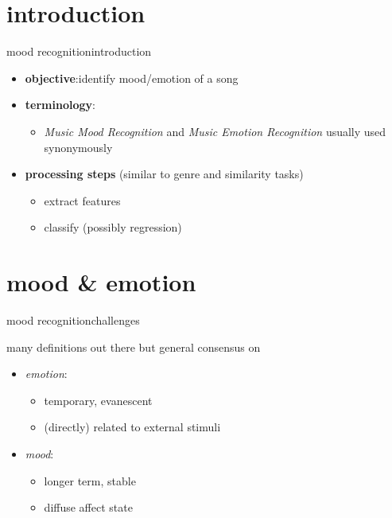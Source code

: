     \section[intro]{introduction}
        \begin{frame}{mood recognition}{introduction}
            
            \begin{itemize}
                \item	\textbf{objective}:identify mood/emotion of a song
                \item<2->   \textbf{terminology}:
                    \begin{itemize}
                        \item \textit{Music Mood Recognition} and \textit{Music Emotion Recognition} usually used synonymously
                    \end{itemize}
                \bigskip
                \item<3->   \textbf{processing steps} (similar to genre and similarity tasks)
                    \begin{itemize}
                        \item   extract features
                        \item   classify (possibly regression)
                    \end{itemize}
            \end{itemize}
        \end{frame}
   
    \section[mood]{mood \& emotion}
        \begin{frame}{mood recognition}{challenges}
            
            many definitions out there but general consensus on
            \begin{itemize}
                \item	\textit{emotion}: 
                    \begin{itemize}
                        \item   temporary, evanescent
                        \item   (directly) related to external stimuli
                    \end{itemize}
                \item	\textit{mood}: 
                    \begin{itemize}
                        \item   longer term, stable
                        \item   diffuse affect state
                    \end{itemize}
            \end{itemize}
        \end{frame}
            
